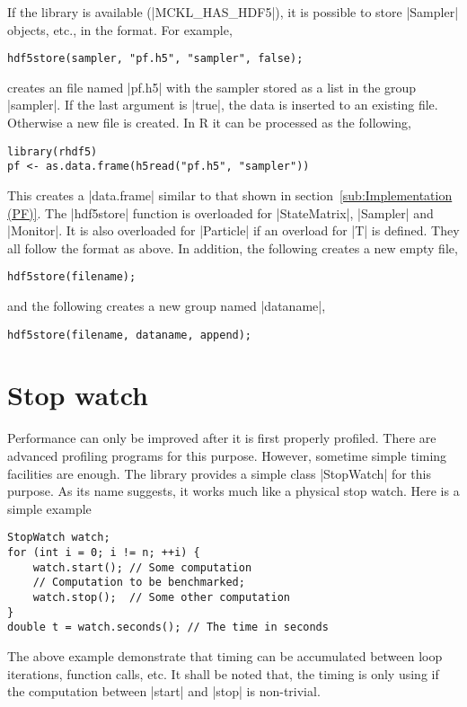 If the \hdf library is available (|MCKL_HAS_HDF5|), it is possible to store
|Sampler| objects, etc., in the \hdf format. For example,
\begin{Verbatim}
hdf5store(sampler, "pf.h5", "sampler", false);
\end{Verbatim}
creates an \hdf file named |pf.h5| with the sampler stored as a list in the
group |sampler|. If the last argument is |true|, the data is inserted to an
existing file. Otherwise a new file is created. In R it can be processed as the
following,
\begin{Verbatim}
library(rhdf5)
pf <- as.data.frame(h5read("pf.h5", "sampler"))
\end{Verbatim}
This creates a |data.frame| similar to that shown in
section~\ref{sub:Implementation (PF)}. The |hdf5store| function is overloaded
for |StateMatrix|, |Sampler| and |Monitor|. It is also overloaded for
|Particle| if an overload for |T| is defined. They all follow the format as
above. In addition, the following creates a new empty \hdf file,
\begin{Verbatim}
hdf5store(filename);
\end{Verbatim}
and the following creates a new group named |dataname|,
\begin{Verbatim}
hdf5store(filename, dataname, append);
\end{Verbatim}

\section{Stop watch}
\label{sec:Stop watch}

Performance can only be improved after it is first properly profiled. There are
advanced profiling programs for this purpose. However, sometime simple timing
facilities are enough. The library provides a simple class |StopWatch| for this
purpose. As its name suggests, it works much like a physical stop watch. Here
is a simple example
\begin{Verbatim}
StopWatch watch;
for (int i = 0; i != n; ++i) {
    watch.start(); // Some computation
    // Computation to be benchmarked;
    watch.stop();  // Some other computation
}
double t = watch.seconds(); // The time in seconds
\end{Verbatim}
The above example demonstrate that timing can be accumulated between loop
iterations, function calls, etc. It shall be noted that, the timing is only
using if the computation between |start| and |stop| is non-trivial.
